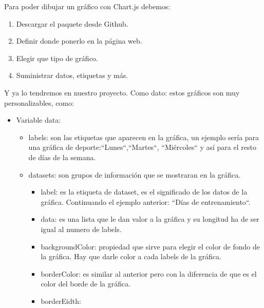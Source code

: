 \documentclass[a4paper, 11pt]{article}
\begin{document}
\begin{itemize}
          Para poder dibujar un gráfico con Chart.js debemos:
          \begin{enumerate}[1.]
            \item Descargar el paquete desde Github.
            \item Definir donde ponerlo en la página web.
            \item Elegir que tipo de gráfico.
            \item Suministrar datos, etiquetas y más.
          \end{enumerate}
          Y ya lo tendremos en nuestro proyecto. Como dato: estos gráficos son muy
          personalizables, como:

          \begin{itemize}
            \item{Variable data:}
              \begin{itemize}
                  \item{labels: son las etiquetas que aparecen en la gráfica, un
                        ejemplo sería para una gráfica de deporte:``Lunes``,``Martes``,
                        ``Miércoles`` y así para el resto de días de la semana.}
                  \item{datasets: son grupos de información que se mostraran en
                        la gráfica.}
                        \begin{itemize}
                          \item{label: es la etiqueta de dataset, es el significado
                                de los datos de la gráfica. Continuando el ejemplo
                                anterior: ``Días de entrenamiento``.}
                          \item{data: es una lista que le dan valor a la gráfica
                                y su longitud ha de ser igual al numero de labels. }
                          \item{backgroundColor: propiedad que sirve para elegir
                                el color de fondo de la gráfica. Hay que darle
                                color a cada labels de la gráfica.}
                          \item{borderColor: es similar al anterior pero con la
                                diferencia de que es el color del borde de la gráfica.}
                          \item{borderEidth: }
                        \end{itemize}
                \end{itemize}
          \end{itemize}


\end{itemize}
\end{document}
